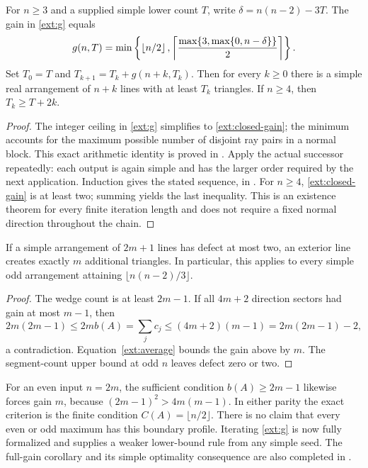 \begin{proposition}
\label{ext:actual-iteration}
For $n\ge3$ and a supplied simple lower count $T$, write
$\delta=n(n-2)-3T$. The gain in \eqref{ext:g} equals
\begin{equation}
 g(n,T)=\min\left\{\left\lfloor n/2\right\rfloor,
       \left\lceil\frac{\max\{3,\max\{0,n-\delta\}\}}2\right\rceil\right\}.
 \label{ext:closed-gain}
\end{equation}
Set $T_0=T$ and $T_{k+1}=T_k+g(n+k,T_k)$. Then for every $k\ge0$
there is a simple real arrangement of $n+k$ lines with at least $T_k$
triangles. If $n\ge4$, then $T_k\ge T+2k$.
\end{proposition}
\begin{proof}
The integer ceiling in \eqref{ext:g} simplifies to
\eqref{ext:closed-gain}; the minimum accounts for the maximum possible
number of disjoint ray pairs in a normal block. This exact arithmetic
identity is proved in
.
Apply the actual successor repeatedly: each output is again simple and
has the larger order required by the next application. Induction gives
the stated sequence, in
.
For $n\ge4$, \eqref{ext:closed-gain} is at least two; summing yields the
last inequality. This is an existence theorem for every finite iteration
length and does not require a fixed normal direction throughout the chain.
\end{proof}

\begin{corollary}
\label{ext:odd-full}
If a simple arrangement of $2m+1$ lines has defect at most two, an exterior
line creates exactly $m$ additional triangles.  In particular, this
applies to every simple odd arrangement attaining
$\lfloor n(n-2)/3\rfloor$.
\end{corollary}

\begin{proof}
The wedge count is at least $2m-1$.  If all $4m+2$ direction sectors had
gain at most $m-1$, then
\[
 2m(2m-1)\leq 2m b(A)=\sum_jc_j
 \leq(4m+2)(m-1)=2m(2m-1)-2,
\]
a contradiction.  Equation~\eqref{ext:average} bounds the gain above by
$m$.  The segment-count upper bound at odd $n$ leaves defect zero or two.
\end{proof}

For an even input $n=2m$, the sufficient condition $b(A)\geq2m-1$ likewise
forces gain $m$, because $(2m-1)^2>4m(m-1)$.  In either parity the exact
criterion is the finite condition $C(A)=\lfloor n/2\rfloor$.
There is no claim that every even or odd maximum has this boundary
profile. Iterating \eqref{ext:g} is now fully formalized and supplies a
weaker lower-bound rule from any simple seed. The full-gain corollary and
its simple optimality consequence are also completed in
.

